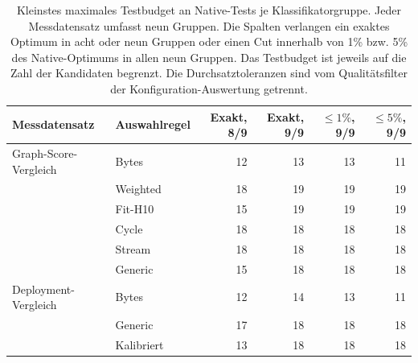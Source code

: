 \begin{table}[t]
\centering\small
\caption{Kleinstes maximales Testbudget an Native-Tests je Klassifikatorgruppe. Jeder Messdatensatz umfasst neun Gruppen. Die Spalten verlangen ein exaktes Optimum in acht oder neun Gruppen oder einen Cut innerhalb von 1\% bzw. 5\% des Native-Optimums in allen neun Gruppen. Das Testbudget ist jeweils auf die Zahl der Kandidaten begrenzt. Die Durchsatztoleranzen sind vom Qualitätsfilter der Konfiguration-Auswertung getrennt.}
\label{tab:rq2-search-budgets}
\begin{tabular}{llrrrr}
\toprule
Messdatensatz & Auswahlregel & Exakt, 8/9 & Exakt, 9/9 & $\leq1\%$, 9/9 & $\leq5\%$, 9/9\\
\midrule
Graph-Score-Vergleich & Bytes & 12 & 13 & 13 & 11\\
 & Weighted & 18 & 19 & 19 & 19\\
 & Fit-H10 & 15 & 19 & 19 & 19\\
 & Cycle & 18 & 18 & 18 & 18\\
 & Stream & 18 & 18 & 18 & 18\\
 & Generic & 15 & 18 & 18 & 18\\
\midrule
Deployment-Vergleich & Bytes & 12 & 14 & 13 & 11\\
 & Generic & 17 & 18 & 18 & 18\\
 & Kalibriert & 13 & 18 & 18 & 18\\
\bottomrule
\end{tabular}
\end{table}
